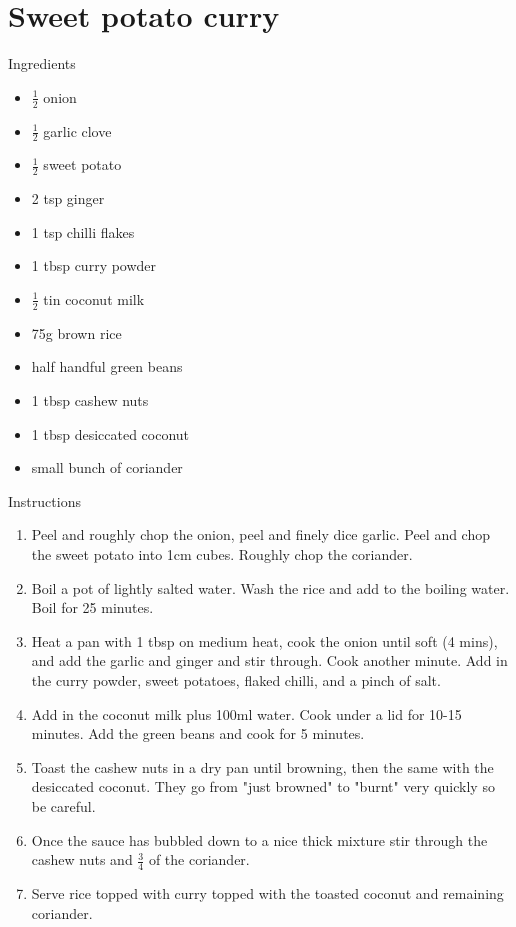 \documentclass[dinner.tex]{subfiles}
\begin{document}
	\pagestyle{fancy}
	\fancyhf{}
	\newpage
	\section{Sweet potato curry}
	\lhead{}
	{\Large Ingredients}
	\begin{multicols}{2}
		\begin{itemize}
			\item \(\frac{1}{2}\) onion
			\item \(\frac{1}{2}\) garlic clove
			\item \(\frac{1}{2}\) sweet potato		
			\item 2 tsp ginger
			\item 1 tsp chilli flakes
			\item 1 tbsp curry powder
		\end{itemize}
		\columnbreak
		\begin{itemize}
			\item \(\frac{1}{2}\) tin coconut milk
			\item 75g brown rice
			\item half handful green beans
			\item 1 tbsp cashew nuts
			\item 1 tbsp desiccated coconut
			\item small bunch of coriander
		\end{itemize}
	\end{multicols}
	
	{\Large Instructions}
	\begin{enumerate}
		\item Peel and roughly chop the onion, peel and finely dice garlic. Peel and chop the sweet potato into 1cm cubes. Roughly chop the coriander.
		\item Boil a pot of lightly salted water. Wash the rice and add to the boiling water. Boil for 25 minutes.
		\item Heat a pan with 1 tbsp on medium heat, cook the onion until soft (4 mins), and add the garlic and ginger and stir through. Cook another minute. Add in the curry powder, sweet potatoes, flaked chilli, and a pinch of salt.
		\item Add in the coconut milk plus 100ml water. Cook under a lid for 10-15 minutes. Add the green beans and cook for 5 minutes.
		\item Toast the cashew nuts in a dry pan until browning, then the same with the desiccated coconut. They go from "just browned" to "burnt" very quickly so be careful.
		\item Once the sauce has bubbled down to a nice thick mixture stir through the cashew nuts and \(\frac{3}{4}\) of the coriander.
		\item Serve rice topped with curry topped with the toasted coconut and remaining coriander.
	\end{enumerate}
\end{document}
